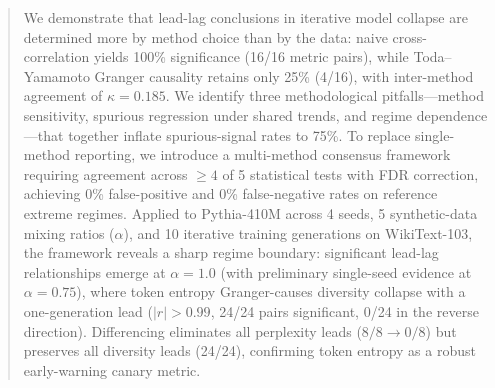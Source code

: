 \begin{abstract}
We demonstrate that lead-lag conclusions in iterative model collapse are determined more by method choice than by the data: naive cross-correlation yields 100\% significance (16/16 metric pairs), while Toda--Yamamoto Granger causality retains only 25\% (4/16), with inter-method agreement of $\kappa = 0.185$. We identify three methodological pitfalls---method sensitivity, spurious regression under shared trends, and regime dependence---that together inflate spurious-signal rates to 75\%. To replace single-method reporting, we introduce a multi-method consensus framework requiring agreement across ${\geq}4$ of 5 statistical tests with FDR correction, achieving 0\% false-positive and 0\% false-negative rates on reference extreme regimes. Applied to Pythia-410M across 4 seeds, 5 synthetic-data mixing ratios ($\alpha$), and 10 iterative training generations on WikiText-103, the framework reveals a sharp regime boundary: significant lead-lag relationships emerge at $\alpha{=}1.0$ (with preliminary single-seed evidence at $\alpha{=}0.75$), where token entropy Granger-causes diversity collapse with a one-generation lead ($|r| > 0.99$, 24/24 pairs significant, 0/24 in the reverse direction). Differencing eliminates all perplexity leads ($8/8 \to 0/8$) but preserves all diversity leads (24/24), confirming token entropy as a robust early-warning canary metric.
\end{abstract}